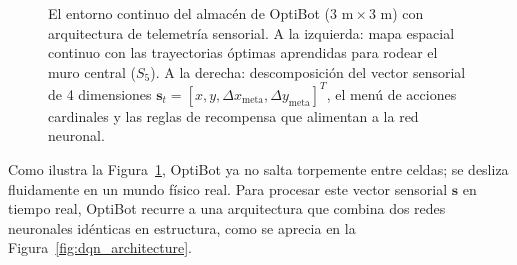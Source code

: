 \begin{figure}[!htb]
\caption{El entorno continuo del almacén de OptiBot ($3\text{ m} \times 3\text{ m}$) con arquitectura de telemetría sensorial. A la izquierda: mapa espacial continuo con las trayectorias óptimas aprendidas para rodear el muro central ($S_5$). A la derecha: descomposición del vector sensorial de 4 dimensiones $\mathbf{s}_t = [x, y, \Delta x_{\text{meta}}, \Delta y_{\text{meta}}]^T$, el menú de acciones cardinales y las reglas de recompensa que alimentan a la red neuronal.}
\label{fig:optibot_continuous_warehouse}
\end{figure}

Como ilustra la Figura~\ref{fig:optibot_continuous_warehouse}, OptiBot ya no salta torpemente entre celdas; se desliza fluidamente en un mundo físico real. Para procesar este vector sensorial $\mathbf{s}$ en tiempo real, OptiBot recurre a una arquitectura que combina dos redes neuronales idénticas en estructura, como se aprecia en la Figura~\ref{fig:dqn_architecture}.

